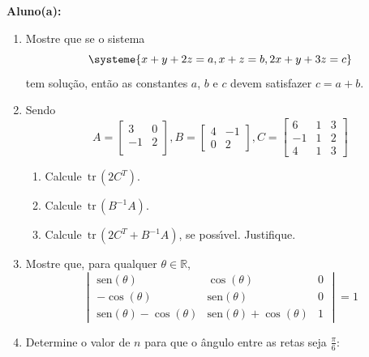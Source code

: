 \documentclass[a4paper,5pt]{amsbook}
\newcommand{\sen}{\text{sen}}
\newcommand{\tr}{\,\mbox{tr}\,}
\begin{document}
\vspace{0.5cm}
{\bf Aluno(a):}\dotfill{}  %

\vspace{0.2cm}
\begin{enumerate}
	\vspace{0.5cm}
	\item Mostre que se o sistema
		\[\systeme{
				x+y+2z=a,
				x+z=b,
				2x+y+3z=c}\]
	tem solu\c{c}\~ao, ent\~ao as constantes $a$, $b$ e $c$ devem satisfazer $c = a+b$.

	\vspace{0.5cm}
	\item Sendo
		\[A = \begin{bmatrix}
				3 & 0 \\
				-1 & 2 \\
			\end{bmatrix},
		B = \begin{bmatrix}
				4 & -1 \\
				0 & 2
			\end{bmatrix},
		C = \begin{bmatrix}
				6 & 1 & 3 \\
				-1 & 1 & 2 \\
				4 & 1 & 3
			\end{bmatrix}\]
		\begin{enumerate}
			\item Calcule $\tr(2C^T)$.
			\item Calcule $\tr(B^{-1}A)$.
			\item Calcule $\tr(2C^T + B^{-1}A)$, se poss\'{\i}vel. Justifique.
		\end{enumerate}

	\vspace{0.5cm}
	\item Mostre que, para qualquer $\theta\in{}\mathbb{R}$,
		\[\begin{vmatrix}
			\sen(\theta) & \cos(\theta) & 0 \\
			-\cos(\theta) & \sen(\theta) & 0 \\
			\sen(\theta)-\cos(\theta) & \sen(\theta)+\cos(\theta) & 1
		\end{vmatrix}=1\]

	\vspace{0.5cm}
	\item Determine o valor de $n$ para que o \^angulo entre as retas seja
		$\frac{\pi}{6}$:


\end{enumerate}
\end{document}
